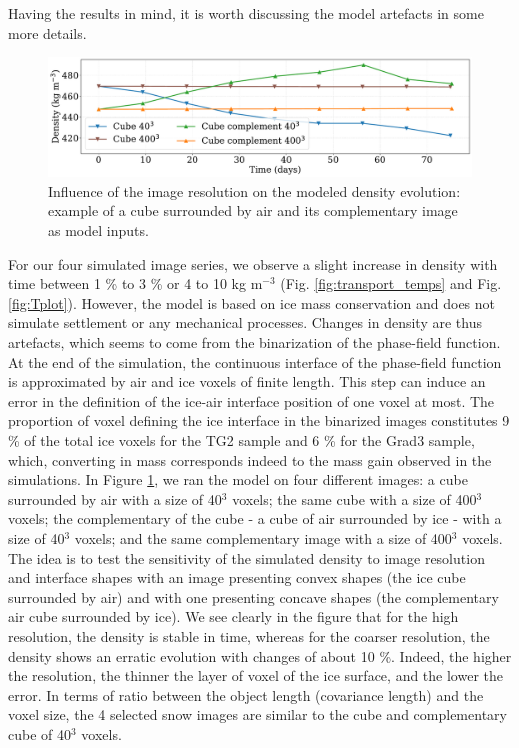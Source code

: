 \documentclass[draft,ms]{agujournal2019}
\begin{document}
Having the results in mind, it is worth discussing the model artefacts in some more details. 
\begin{figure}
    \centering
    \includegraphics[width=0.9\linewidth]{Figures/cubes_compl_density_propre.pdf}
    \caption{Influence of the image resolution on the modeled density evolution: example of a cube surrounded by air and its complementary image as model inputs.}
    \label{fig:cubes}
\end{figure}
For our four simulated image series, we observe a slight increase in density with time between 1 \% to 3 \% or 4 to 10 kg m$^{-3}$ (Fig. \ref{fig:transport_temps} and Fig. \ref{fig:Tplot}). However, the model is based on ice mass conservation and does not simulate settlement or any mechanical processes. Changes in density are thus artefacts, which seems to come from the binarization of the phase-field function. At the end of the simulation, the continuous interface of the phase-field function is approximated by air and ice voxels of finite length. This step can induce an error in the definition of the ice-air interface position of one voxel at most. The proportion of voxel defining the ice interface in the binarized images constitutes 9 \% of the total ice voxels for the TG2 sample and 6 \% for the Grad3 sample, which, converting in mass corresponds indeed to the mass gain observed in the simulations. In Figure \ref{fig:cubes}, we ran the model on four different images: a cube surrounded by air with a size of 40$^3$ voxels; the same cube with a size of 400$^3$ voxels; the complementary of the cube - a cube of air surrounded by ice - with a size of 40$^3$ voxels; and the same complementary image with a size of 400$^3$ voxels. The idea is to test the sensitivity of the simulated density to image resolution and interface shapes with an image presenting convex shapes (the ice cube surrounded by air) and with one presenting concave shapes (the complementary air cube surrounded by ice). We see clearly in the figure that for the high resolution, the density is stable in time, whereas for the coarser resolution, the density shows an erratic evolution with changes of about 10 \%. Indeed, the higher the resolution, the thinner the layer of voxel of the ice surface, and the lower the error. In terms of ratio between the object length (covariance length) and the voxel size, the 4 selected snow images are similar to the cube and complementary cube of 40$^3$ voxels. %
\end{document}

